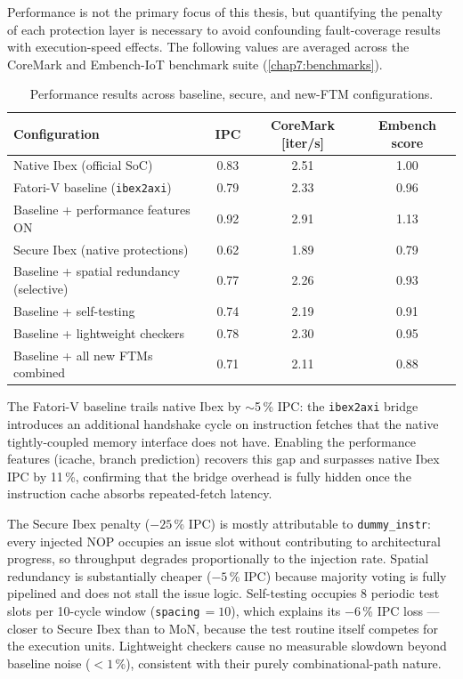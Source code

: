 Performance is not the primary focus of this thesis, but quantifying the penalty of each
protection layer is necessary to avoid confounding fault-coverage results with execution-speed
effects. The following values are averaged across the CoreMark and Embench-IoT benchmark suite
(\cref{chap7:benchmarks}).

\begin{table}[H]
\centering
\caption{Performance results across baseline, secure, and new-\ac{FTM} configurations.}
\label{tab:perf_results}
\footnotesize
\begin{tabularx}{\textwidth}{lccc}
\toprule
Configuration & IPC & CoreMark [iter/s\textbf{]} & Embench score \\
\midrule
Native Ibex (official SoC)               & 0.83 & 2.51 & 1.00 \\
\ac{Fatori-V} baseline (\texttt{ibex2axi}) & 0.79 & 2.33 & 0.96 \\
Baseline + performance features ON       & 0.92 & 2.91 & 1.13 \\
Secure Ibex (native protections)         & 0.62 & 1.89 & 0.79 \\
Baseline + spatial redundancy (selective)& 0.77 & 2.26 & 0.93 \\
Baseline + self-testing                  & 0.74 & 2.19 & 0.91 \\
Baseline + lightweight checkers          & 0.78 & 2.30 & 0.95 \\
Baseline + all new \acp{FTM} combined    & 0.71 & 2.11 & 0.88 \\
\bottomrule
\end{tabularx}
\end{table}

The \ac{Fatori-V} baseline trails native Ibex by $\sim$5\,\% IPC: the \texttt{ibex2axi} bridge
introduces an additional handshake cycle on instruction fetches that the native tightly-coupled
memory interface does not have. Enabling the performance features (icache, branch prediction)
recovers this gap and surpasses native Ibex IPC by 11\,\%, confirming that the bridge overhead is
fully hidden once the instruction cache absorbs repeated-fetch latency.

The Secure Ibex penalty ($-25$\,\% IPC) is mostly attributable to \texttt{dummy\_instr}: every
injected NOP occupies an issue slot without contributing to architectural progress, so throughput
degrades proportionally to the injection rate. Spatial redundancy is substantially cheaper
($-5$\,\% IPC) because majority voting is fully pipelined and does not stall the issue logic.
Self-testing occupies 8 periodic test slots per 10-cycle window (\texttt{spacing}$\,=10$), which
explains its $-6$\,\% IPC loss — closer to Secure Ibex than to MoN, because the test routine
itself competes for the execution units. Lightweight checkers cause no measurable slowdown beyond
baseline noise ($<1$\,\%), consistent with their purely combinational-path nature.


